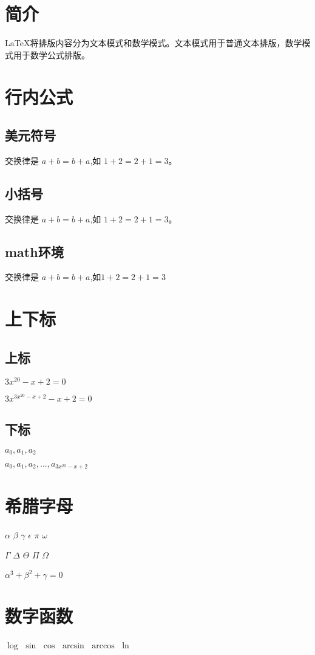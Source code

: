 \documentclass{article}%
\begin{document}
	\section{简介}
	\LaTeX{}将排版内容分为文本模式和数学模式。文本模式用于普通文本排版，数学模式用于数学公式排版。
	\section{行内公式}
	\subsection{美元符号}
	交换律是 $a+b=b+a$,如 $1+2=2+1=3$。
	\subsection{小括号}
	交换律是 \(a+b=b+a\),如 \(1+2=2+1=3\)。
	\subsection{math环境}
	交换律是 \begin{math}a+b=b+a\end{math},如\begin{math}
	1+2=2+1=3\end{math}
	\section{上下标}
	\subsection{上标}
	$3x^{20} - x + 2 = 0$
	
	$3x^{3x^{20} - x + 2} - x + 2 = 0$
	\subsection{下标}
	$a_0,a_1,a_2$
	
	$a_0,a_1,a_2,...,a_{3x^{20} - x + 2}$
	\section{希腊字母}
	$\alpha$
	$\beta$
	$\gamma$
	$\epsilon$
	$\pi$
	$\omega$
	
	$\Gamma$
	$\Delta$
	$\Theta$
	$\Pi$
	$\Omega$
	
	$\alpha^3 + \beta^2 + \gamma = 0$
	\section{数字函数}
	$\log$
	$\sin$
	$\cos$
	$\arcsin$
	$\arccos$
	$\ln$
	
\end{document}
